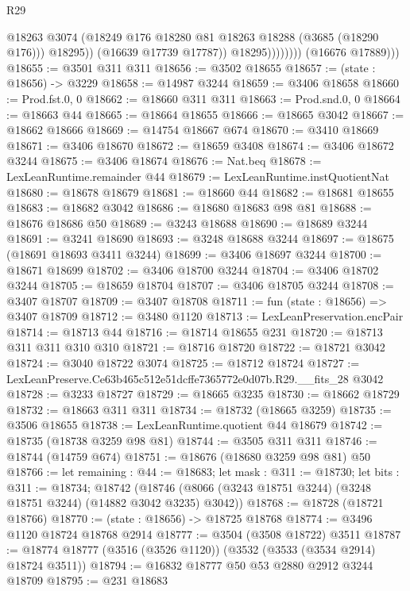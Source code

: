 \begin{lexlean}{R29}
\begin{coremodule}
                              @18263
                              @3074
                              (@18249 @176 @18280 @81 @18263 @18288 (@3685 (@18290 @176)))
                              @18295))
                          (@16639 @17739 @17787))
                        @18295))))))))
        (@16676 @17889)))
@18655 := @3501 @311 @311
@18656 := @3502 @18655
@18657 := (state : @18656) -> @3229
@18658 := @14987 @3244
@18659 := @3406 @18658
@18660 := Prod.fst.{0, 0}
@18662 := @18660 @311 @311
@18663 := Prod.snd.{0, 0}
@18664 := @18663 @44
@18665 := @18664 @18655
@18666 := @18665 @3042
@18667 := @18662 @18666
@18669 := @14754 @18667 @674
@18670 := @3410 @18669
@18671 := @3406 @18670
@18672 := @18659 @3408
@18674 := @3406 @18672 @3244
@18675 := @3406 @18674
@18676 := Nat.beq
@18678 := LexLeanRuntime.remainder @44
@18679 := LexLeanRuntime.instQuotientNat
@18680 := @18678 @18679
@18681 := @18660 @44
@18682 := @18681 @18655
@18683 := @18682 @3042
@18686 := @18680 @18683 @98 @81
@18688 := @18676 @18686 @50
@18689 := @3243 @18688
@18690 := @18689 @3244
@18691 := @3241 @18690
@18693 := @3248 @18688 @3244
@18697 := @18675 (@18691 @18693 @3411 @3244)
@18699 := @3406 @18697 @3244
@18700 := @18671 @18699
@18702 := @3406 @18700 @3244
@18704 := @3406 @18702 @3244
@18705 := @18659 @18704
@18707 := @3406 @18705 @3244
@18708 := @3407 @18707
@18709 := @3407 @18708
@18711 := fun (state : @18656) => @3407 @18709
@18712 := @3480 @1120
@18713 := LexLeanPreservation.encPair
@18714 := @18713 @44
@18716 := @18714 @18655 @231
@18720 := @18713 @311 @311 @310 @310
@18721 := @18716 @18720
@18722 := @18721 @3042
@18724 := @3040 @18722 @3074
@18725 := @18712 @18724
@18727 := LexLeanPreserve.Ce63b465c512e51dcffe7365772e0d07b.R29.__fits_28 @3042
@18728 := @3233 @18727
@18729 := @18665 @3235
@18730 := @18662 @18729
@18732 := @18663 @311 @311
@18734 := @18732 (@18665 @3259)
@18735 := @3506 @18655
@18738 := LexLeanRuntime.quotient @44 @18679
@18742 := @18735 (@18738 @3259 @98 @81)
@18744 := @3505 @311 @311
@18746 := @18744 (@14759 @674)
@18751 := @18676 (@18680 @3259 @98 @81) @50
@18766 := let remaining : @44 := @18683;
  let mask : @311 := @18730;
  let bits : @311 := @18734;
  @18742 (@18746 (@8066 (@3243 @18751 @3244) (@3248 @18751 @3244) (@14882 @3042 @3235) @3042))
@18768 := @18728 (@18721 @18766)
@18770 := (state : @18656) -> @18725 @18768
@18774 := @3496 @1120 @18724 @18768 @2914
@18777 := @3504 (@3508 @18722) @3511
@18787 := @18774 @18777 (@3516 (@3526 @1120)) (@3532 (@3533 (@3534 @2914) @18724 @3511))
@18794 := @16832 @18777 @50 @53 @2880 @2912 @3244 @18709
@18795 := @231 @18683

\end{coremodule}
\end{lexlean}
